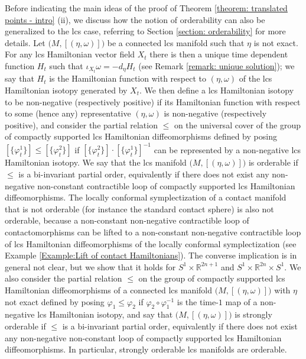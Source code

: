 \documentclass{amsart}
\theoremstyle{remark}
\begin{document}
Before indicating the main ideas
of the proof of Theorem \ref{theorem: translated points - intro} (ii),
we discuss how the notion of orderability
can also be generalized to the lcs case,
referring to Section \ref{section: orderability}
for more details.
Let $\big( M, [(\eta, \omega)] \big)$ be a connected lcs manifold
such that $\eta$ is not exact.
For any lcs Hamiltonian vector field $X_t$
there is then a unique time dependent function $H_t$
such that $\iota_{X_t}\omega = - d_{\eta} H_t$
(see Remark \ref{remark: unique solution});
we say that $H_t$ is the Hamiltonian function
with respect to $(\eta, \omega)$
of the lcs Hamiltonian isotopy
generated by $X_t$.
We then define a lcs Hamiltonian isotopy
to be non-negative (respectively positive)
if its Hamiltonian function
with respect to some (hence any) representative $(\eta, \omega)$
is non-negative (respectively positive),
and consider the partial relation $\leq$
on the universal cover of the group
of compactly supported lcs Hamiltonian diffeomorphisms
defined by posing $[\{\varphi_t^{1}\}] \leq [\{\varphi_t^{2}\}]$
if $[\{\varphi_t^{2}\}] \cdot [\{\varphi_t^{1}\}]^{-1}$
can be represented by a non-negative lcs Hamiltonian isotopy.
We say that the lcs manifold $\big( M, [(\eta, \omega)] \big)$ is orderable
if $\leq$ is a bi-invariant partial order,
equivalently if there does not exist
any non-negative non-constant contractible loop
of compactly supported lcs Hamiltonian diffeomorphisms.
The locally conformal symplectization
of a contact manifold that is not orderable
(for instance the standard contact sphere)
is also not orderable,
because a non-constant non-negative contractible loop of contactomorphisms
can be lifted to a non-constant non-negative contractible loop
of lcs Hamiltonian diffeomorphisms of the locally conformal symplectization
(see Example \ref{Example:Lift of contact Hamiltonians}).
The converse implication is in general not clear,
but we show that it holds
for $S^1 \times \mathbb{R}^{2n+1}$ and $S^1 \times \mathbb{R}^{2n} \times S^1$.
We also consider the partial relation $\leq$
on the group of compactly supported lcs Hamiltonian diffeomorphisms
of a connected lcs manifold $\big( M, [(\eta, \omega)] \big)$
with $\eta$ not exact
defined by posing $\varphi_1 \leq \varphi_2$
if $\varphi_2 \circ \varphi_1^{-1}$
is the time-$1$ map of a non-negative lcs Hamiltonian isotopy,
and say that $\big( M, [(\eta, \omega)] \big)$ is strongly orderable
if $\leq$ is a bi-invariant partial order,
equivalently
if there does not exist
any non-negative non-constant loop
of compactly supported lcs Hamiltonian diffeomorphisms.
In particular,
strongly orderable lcs manifolds
are orderable.
\end{document}
